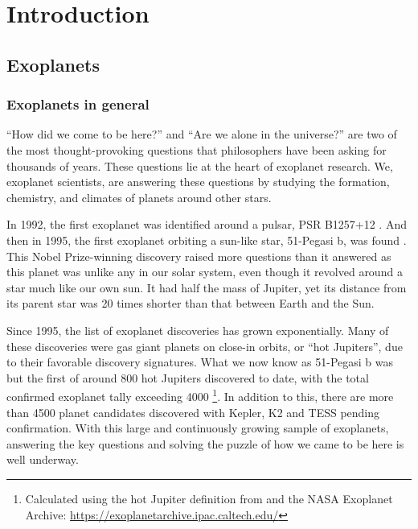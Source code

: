 \chapter{Introduction}
\label{ch:intro}

\graphicspath{{./gfx/fig_intro/}}


\section{Exoplanets}

\subsection{Exoplanets in general}

``How did we come to be here?'' and ``Are we alone in the universe?'' are two of the most thought-provoking questions that philosophers have been asking for thousands of years. These questions lie at the heart of exoplanet research. We, exoplanet scientists, are answering these questions by studying the formation, chemistry, and climates of planets around other stars.

In 1992, the first exoplanet was identified around a pulsar, PSR B1257+12 \citep{Wolszczan1992}. And then in 1995, the first exoplanet orbiting a sun-like star, 51-Pegasi b, was found \citep{Mayor1995}. This Nobel Prize-winning discovery raised more questions than it answered as this planet was  unlike any in our solar system, even though it revolved around  a star much like our own sun. It had half the mass of Jupiter, yet its distance from its parent star was 20 times shorter than that between Earth and the Sun.

Since 1995, the list of exoplanet discoveries has grown exponentially. Many of these discoveries were gas giant planets on close-in orbits, or ``hot Jupiters'', due to their favorable discovery signatures. What we now know as 51-Pegasi b was but the first of around 800 hot Jupiters discovered to date, with the total confirmed exoplanet tally exceeding 4000 \footnote{Calculated using the hot Jupiter definition from \citet{Winn2010} and the NASA Exoplanet Archive: \href{https://exoplanetarchive.ipac.caltech.edu/}{https://exoplanetarchive.ipac.caltech.edu/}}. In addition to this, there are more than 4500 planet candidates discovered with Kepler, K2 and TESS pending confirmation. With this large and continuously growing sample of exoplanets, answering the key questions and solving the puzzle of how we came to be here is well underway.

